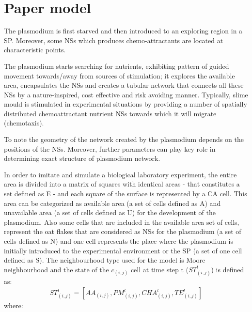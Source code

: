 \section{Paper model}
The plasmodium is first starved and then introduced to an exploring region in a SP. Moreover, some NSs which produces chemo-attractants are located at characteristic points. 
\par
The plasmodium starts searching for nutrients, exhibiting pattern of guided movement towards/away from sources of stimulation; it explores the available area, encapsulates the NSs and creates a tubular network that connects all these NSs by a nature-inspired, cost effective and risk avoiding manner.
Typically, slime mould is stimulated in experimental situations by providing a number of spatially distributed chemoattractant nutrient NSs towards which it will migrate (chemotaxis). 
\par
To note the geometry of the network created by the plasmodium depends on the positions of the NSs. Moreover, further parameters can play key role in determining exact structure of plasmodium network.
\par
In order to imitate and simulate a biological laboratory experiment, the entire area is divided into a matrix of squares with identical areas - that constitutes a set defined as E - and each square of the surface is represented by a CA cell.
This area can be categorized as available area (a set of cells defined as A) and unavailable area (a set of cells defined as U) for the development of the plasmodium.
Also some cells that are included in the available area set of cells, represent the oat flakes that are considered as NSs for the plasmodium (a set of cells defined as N) and one cell represents the place where the plasmodium is initially introduced to the
experimental environment or the SP (a set of one cell defined as S). 
The neighbourhood type used for the model is Moore neighbourhood and the state of the $c_{(i, j)}$ cell at time step t ($ ST^t_{(i, j)}$) is defined as:
\begin{align}
ST^t_{(i, j)} = [AA_{(i, j)}, PM^t_{(i, j)}, CHA^t_{(i, j)}, TE^t_{(i, j)}]
\end{align}
where:

